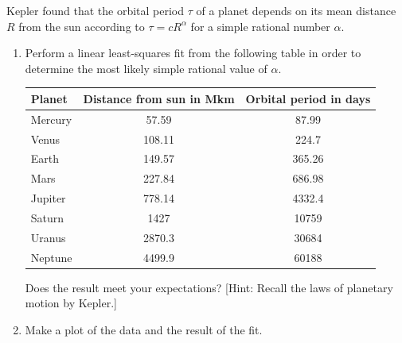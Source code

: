 \begin{exercise}

	Kepler found that the orbital period $\tau$ of a planet depends on its mean
	distance $R$ from the sun according to $\tau=c R^{\alpha}$ for a simple rational
	number $\alpha$.
	\begin{enumerate}[label=(\alph*)]
		\item Perform a linear least-squares fit from the following table in
		      order to determine the most likely simple rational value of $\alpha$.

		      \begin{center}
			      \renewcommand{\arraystretch}{1.2}
			      \begin{tabular}{lcc}
				      \toprule
				      Planet & Distance from sun in Mkm & Orbital period in days \\
				      \midrule
				      Mercury         & 57.59                             & 87.99                           \\
				      Venus           & 108.11                            & 224.7                           \\
				      Earth           & 149.57                            & 365.26                          \\
				      Mars            & 227.84                            & 686.98                          \\
				      Jupiter         & 778.14                            & 4332.4                          \\
				      Saturn          & 1427                              & 10759                           \\
				      Uranus          & 2870.3                            & 30684                           \\
				      Neptune         & 4499.9                            & 60188                           \\
				      \bottomrule
			      \end{tabular}
		      \end{center}

		      Does the result meet your expectations? [Hint: Recall the laws of
			      planetary motion by Kepler.]

		\item Make a plot of the data and the result of the fit.
	\end{enumerate}

\end{exercise}

